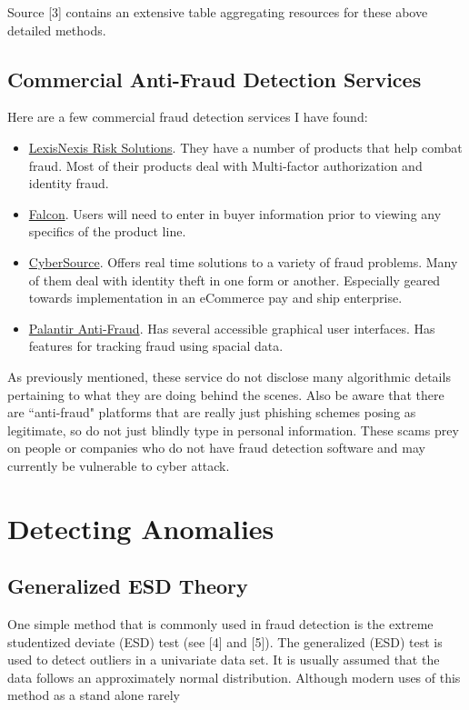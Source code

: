 \documentclass[12pt]{article}
\begin{document}
Source [3] contains an extensive table aggregating resources for these above detailed methods. 

\subsection{Commercial Anti-Fraud Detection Services}
Here are a few commercial fraud detection services I have found:
\begin{itemize}
\item \href{http://www.lexisnexis.com/risk/financial/fs-fraud-detection-prevention.aspx}{LexisNexis Risk Solutions}.   They have a number of products that help combat fraud. Most of their products deal with Multi-factor authorization and identity fraud.  
\item \href{http://www.fico.com/en/products/fico-falcon-fraud-manager#overview}{Falcon}. Users will need to enter in buyer information prior to viewing any specifics of the product line. 
\item \href{https://www.cybersource.com/products/fraud_management/}{CyberSource}. Offers real time solutions to a variety of fraud problems. Many of them deal with identity theft in one form or another. Especially geared towards implementation in an eCommerce pay and ship enterprise. 
\item \href{https://www.palantir.com/solutions/anti-fraud/}{Palantir Anti-Fraud}. Has several accessible graphical user interfaces. Has features for tracking fraud using spacial data. 
\end{itemize}
As previously mentioned, these service do not disclose many algorithmic details pertaining to what they are doing behind the scenes. Also be aware that there are ``anti-fraud" platforms that are really just phishing schemes posing as legitimate, so do not just blindly type in personal information. These scams prey on people or companies who do not have fraud detection software and may currently be vulnerable to cyber attack.  
\section{Detecting Anomalies} 

\subsection{Generalized ESD Theory}\label{ESD} One simple method that is commonly used in fraud detection is the extreme studentized deviate (ESD) test (see [4] and [5]). The generalized (ESD) test is used to detect outliers in a univariate data set.  It is usually assumed that the data follows an approximately normal distribution. Although modern uses of this method as a stand alone rarely
\end{document}
